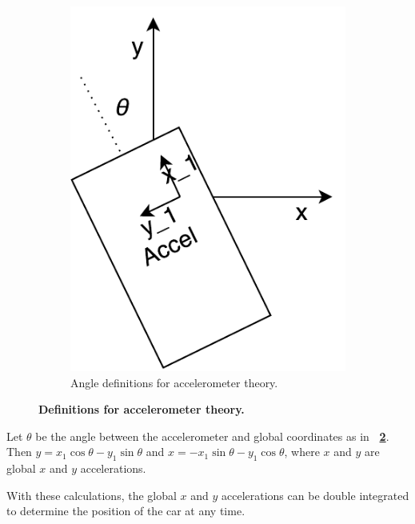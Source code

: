 \documentclass[letterpaper, 11pt]{article}
\newcommand*{\figref}[1]{\textbf{\figurename~\ref{#1}}}
\begin{document}
\begin{figure}[ht]
\begin{subfigure}[t]{0.48\textwidth}
        \includegraphics[height=0.4\textheight]{images/accel2.pdf}
        \caption{Angle definitions for accelerometer theory.}
        \label{fig:accel2}
    \end{subfigure}
    \caption{\textbf{Definitions for accelerometer theory.}}
\end{figure}

Let $\theta$ be the angle between the accelerometer and global coordinates as in \figref{fig:accel2}. Then $y = x_1\cos{\theta} - y_1\sin{\theta}$ and $x = -x_1\sin{\theta} - y_1\cos{\theta}$, where $x$ and $y$ are global $x$ and $y$ accelerations. 

With these calculations, the global $x$ and $y$ accelerations can be double integrated to determine the position of the car at any time.

\clearpage
\end{document}
